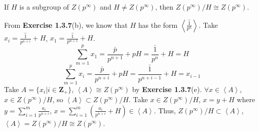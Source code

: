 $$ $$

\begin{ex}
    If $H$ is a subgroup of $Z(p^{\infty})$ and $H\neq Z(p^{\infty})$, then $Z(p^{\infty}) /H\cong Z(p^{\infty})$.
\end{ex}

\begin{answer}
    From \textbf{Exercise 1.3.7}(b), we know that $H$ has the form $\left\langle \bar{\frac{1}{p^{n}}}\right\rangle$. Take $x_{i}=\bar{\frac{1}{p^{n+i}}}+H$, $x_{1}=\bar{\frac{1}{p^{n+1}}}+H$. \[\sum_{m=1}^{p}x_{1}=\bar{\frac{p}{p^{n+1}}}+pH=\bar{\frac{1}{p^{n}}}+H=H\] \[\sum_{m=1}^{p}x_{i}=\bar{\frac{p}{p^{n+i}}}+pH=\bar{\frac{1}{p^{n+i-1}}}+H=x_{i-1}\] Take $A=\{x_{i}|i\in \mathbf{Z}_{+}\}$, $\left\langle A\right\rangle\cong Z(p^{\infty})$ by \textbf{Exercise 1.3.7}(e). $\forall x\in \left\langle A\right\rangle$, $x\in Z(p^{\infty}) /H$, so $\left\langle A\right\rangle\subset Z(p^{\infty}) /H$. Take $x\in Z(p^{\infty}) /H$, $x=y+H$ where $y=\sum\limits_{i=1}^{m}\frac{a_{i}}{p^{n+i}}$, $x=\sum\limits_{i=1}^{m}(\frac{a_{i}}{p^{n+i}}+H)\in \left\langle A\right\rangle$. Thus, $Z(p^{\infty}) /H\subset \left\langle A\right\rangle$, $\left\langle A\right\rangle=Z(p^{\infty}) /H\cong Z(p^{\infty})$.
\end{answer}